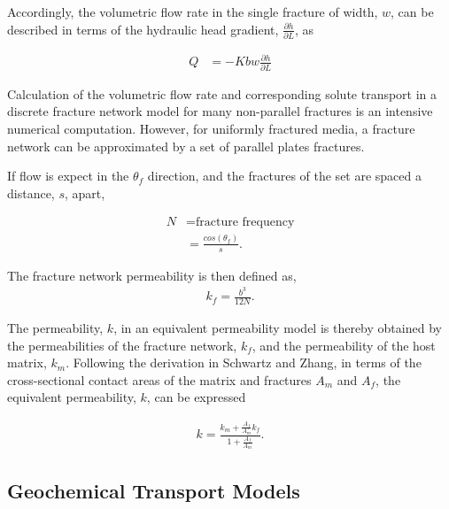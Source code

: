 Accordingly, the volumetric flow rate in the single fracture of width, $w$, can
be described in terms of the hydraulic head gradient, $\frac{\partial
h}{\partial L}$, as

\begin{align} Q & = -Kbw\frac{\partial h}{\partial L} \label{Qplates}
\end{align}

Calculation of the volumetric flow rate and corresponding solute transport in a
discrete fracture network model for many non-parallel fractures is an intensive
numerical computation. However, for uniformly fractured media, a fracture
network can be approximated by a set of parallel plates fractures. 

If flow is expect in the $\theta_f$ direction, and the fractures of the set are
spaced a distance, $s$, apart,

\begin{align} N &= \mbox{fracture frequency}\nonumber\\ &=
\frac{cos(\theta_f)}{s}.  \label{fracfreq} \end{align}

The fracture network permeability is then defined as, \begin{align} k_f =
\frac{b^3}{12N}.  \label{fracperm} \end{align}

The permeability, $k$, in an equivalent permeability model is thereby obtained
by the permeabilities of the fracture network, $k_f$, and the permeability of
the host matrix, $k_m$. Following the derivation in Schwartz and Zhang, in
terms of the cross-sectional contact areas of the matrix and fractures $A_m$
and $A_f$, the equivalent permeability, $k$, can be expressed

\begin{align} k = \frac{k_m + \frac{A_f}{A_m}k_f}{1+\frac{A_f}{A_m}}.
\label{equivperm} \end{align}

\subsection{Geochemical Transport Models}



